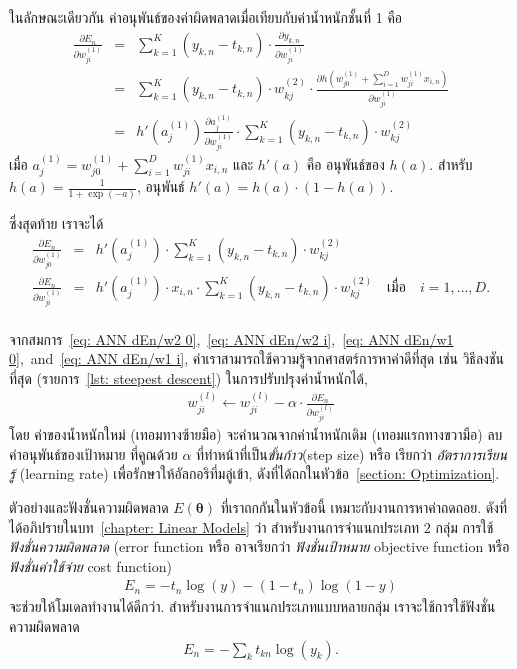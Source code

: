 ในลักษณะเดียวกัน ค่าอนุพันธ์ของค่าผิดพลาดเมื่อเทียบกับค่าน้ำหนักชั้นที่ 1 คือ
\begin{eqnarray}
   \frac{\partial E_n}{\partial w^{(1)}_{ji}} &=& \sum_{k=1}^ K (y_{k,n} - t_{k,n}) \cdot \frac{\partial y_{k,n}}{\partial w^{(1)}_{ji}}
\label{eq: ANN dEn/w1 step 1} \\
   &=& \sum_{k=1}^ K (y_{k,n} - t_{k,n}) \cdot w^{(2)}_{kj} \cdot \frac{\partial h\left( w^{(1)}_{j0} + \sum_{i=1}^D w^{(1)}_{ji} x_{i,n} \right)}{\partial w^{(1)}_{ji}}   
\label{eq: ANN dEn/w1 step 2} \\
   &=& h' ( a_j^{(1)} )  
   \frac{\partial a_j^{(1)} }{\partial w^{(1)}_{ji}} \cdot  \sum_{k=1}^ K (y_{k,n} - t_{k,n}) \cdot w^{(2)}_{kj}    
\label{eq: ANN dEn/w1 step 3}   
\end{eqnarray}
เมื่อ $a_j^{(1)} = w^{(1)}_{j0} + \sum_{i=1}^D w^{(1)}_{ji} x_{i,n}$ และ $h'(a)$ คือ อนุพันธ์ของ $h(a)$.
สำหรับ $h(a) = \frac{1}{1 + \exp(-a)}$, อนุพันธ์ $h'(a) = h(a) \cdot (1 - h(a))$.

ซึ่งสุดท้าย เราจะได้
\begin{eqnarray}
   \frac{\partial E_n}{\partial w^{(1)}_{j0}} &=& h' ( a_j^{(1)} )  
   \cdot  \sum_{k=1}^ K (y_{k,n} - t_{k,n}) \cdot w^{(2)}_{kj}
\label{eq: ANN dEn/w1 0} \\
   \frac{\partial E_n}{\partial w^{(1)}_{ji}} &=& h' ( a_j^{(1)} ) \cdot x_{i,n}  
   \cdot  \sum_{k=1}^ K (y_{k,n} - t_{k,n}) \cdot w^{(2)}_{kj}
   \quad \mbox{เมื่อ} \quad i = 1, \ldots, D.
\nonumber\\   
\label{eq: ANN dEn/w1 i}
\end{eqnarray}

จากสมการ~\ref{eq: ANN dEn/w2 0},~\ref{eq: ANN dEn/w2 i},~\ref{eq: ANN dEn/w1 0},~and~\ref{eq: ANN dEn/w1 i}, ค่าเราสามารถใช้ความรู้จากศาสตร์การหาค่าดีที่สุด เช่น วิธีลงชันที่สุด (รายการ~\ref{lst: steepest descent}) ในการปรับปรุงค่าน้ำหนักได้,
\begin{eqnarray}
   w^{(l)}_{ji}  \gets w^{(l)}_{ji} - \alpha \cdot \frac{\partial E_n}{\partial w^{(l)}_{ji}}
\label{eq: ANN update w grad desc}
\end{eqnarray}
%
โดย ค่าของน้ำหนักใหม่ (เทอมทางซ้ายมือ) จะคำนวณจากค่าน้ำหนักเดิม (เทอมแรกทางขวามือ) ลบค่าอนุพันธ์ของเป้าหมาย ที่คูณด้วย $\alpha$ ที่ทำหน้าที่เป็น\textit{ขั้นก้าว}(step size) หรือ เรียกว่า \textit{อัตราการเรียนรู้} (learning rate) เพื่อรักษาให้อัลกอริทึ่มลู่เข้า, ดังที่ได้ถกในหัวข้อ~\ref{section: Optimization}.

ตัวอย่างและฟังชั่นความผิดพลาด $E(\bm{\theta})$ ที่เราถกกันในหัวข้อนี้ เหมาะกับงานการหาค่าถดถอย.
ดังที่ได้อภิปรายในบท~\ref{chapter: Linear Models} ว่า สำหรับงานการจำแนกประเภท $2$ กลุ่ม การใช้\textit{ฟังชั่นความผิดพลาด} (error function หรือ อาจเรียกว่า \textit{ฟังชั่นเป้าหมาย} objective function หรือ \textit{ฟังชั่นค่าใช้จ่าย} cost function) 
\begin{eqnarray}
   E_n = - t_n \log (y) - (1-t_n) \log(1-y)
\label{eq: ann cost fn biclass}
\end{eqnarray}
จะช่วยให้โมเดลทำงานได้ดีกว่า.
สำหรับงานการจำแนกประเภทแบบหลายกลุ่ม เราจะใช้การใช้ฟังชั่นความผิดพลาด 
\begin{eqnarray}
   E_n = - \sum_k t_{kn} \log (y_k).
\label{eq: ann cost fn multiclass}
\end{eqnarray}

